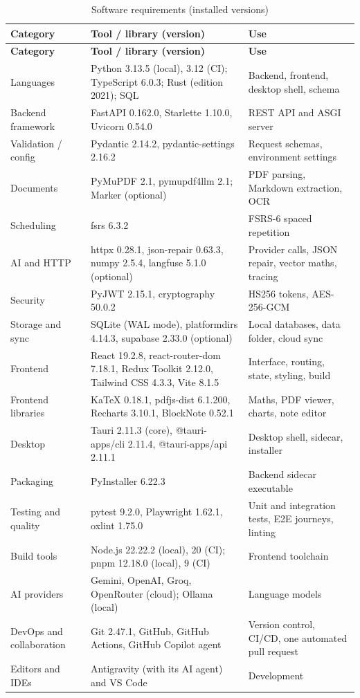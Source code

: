 \begin{small}
\begin{longtable}{@{}>{\raggedright\arraybackslash}p{2.8cm} >{\raggedright\arraybackslash}p{5.8cm} >{\raggedright\arraybackslash}p{5.4cm}@{}}
\caption{Software requirements (installed versions)}\label{tab:sw}\\
\toprule
\textbf{Category} & \textbf{Tool / library (version)} & \textbf{Use}\\
\midrule
\endfirsthead
\toprule
\textbf{Category} & \textbf{Tool / library (version)} & \textbf{Use}\\
\midrule
\endhead
\bottomrule
\endfoot
Languages & Python 3.13.5 (local), 3.12 (CI); TypeScript 6.0.3; Rust (edition 2021); SQL &
Backend, frontend, desktop shell, schema\\
Backend framework & FastAPI 0.162.0, Starlette 1.10.0, Uvicorn 0.54.0 & REST API and ASGI
server\\
Validation / config & Pydantic 2.14.2, pydantic-settings 2.16.2 & Request schemas,
environment settings\\
Documents & PyMuPDF 2.1, pymupdf4llm 2.1; Marker (optional) & PDF parsing, Markdown
extraction, OCR\\
Scheduling & fsrs 6.3.2 & FSRS-6 spaced repetition\\
AI and HTTP & httpx 0.28.1, json-repair 0.63.3, numpy 2.5.4, langfuse 5.1.0 (optional) &
Provider calls, JSON repair, vector maths, tracing\\
Security & PyJWT 2.15.1, cryptography 50.0.2 & HS256 tokens, AES-256-GCM\\
Storage and sync & SQLite (WAL mode), platformdirs 4.14.3, supabase 2.33.0 (optional) &
Local databases, data folder, cloud sync\\
Frontend & React 19.2.8, react-router-dom 7.18.1, Redux Toolkit 2.12.0, Tailwind CSS 4.3.3,
Vite 8.1.5 & Interface, routing, state, styling, build\\
Frontend libraries & KaTeX 0.18.1, pdfjs-dist 6.1.200, Recharts 3.10.1, BlockNote 0.52.1 &
Maths, PDF viewer, charts, note editor\\
Desktop & Tauri 2.11.3 (core), @tauri-apps/cli 2.11.4, @tauri-apps/api 2.11.1 & Desktop
shell, sidecar, installer\\
Packaging & PyInstaller 6.22.3 & Backend sidecar executable\\
Testing and quality & pytest 9.2.0, Playwright 1.62.1, oxlint 1.75.0 & Unit and integration
tests, E2E journeys, linting\\
Build tools & Node.js 22.22.2 (local), 20 (CI); pnpm 12.18.0 (local), 9 (CI) & Frontend
toolchain\\
AI providers & Gemini, OpenAI, Groq, OpenRouter (cloud); Ollama (local) & Language models\\
DevOps and collaboration & Git 2.47.1, GitHub, GitHub Actions, GitHub Copilot agent & Version
control, CI/CD, one automated pull request\\
Editors and IDEs & Antigravity (with its AI agent) and VS Code & Development\\
\end{longtable}
\end{small}

